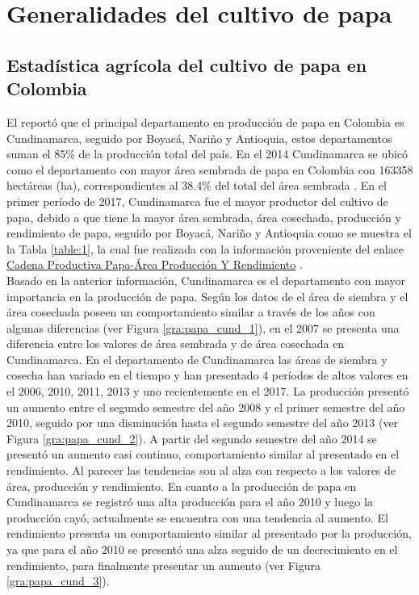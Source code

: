 \section{Generalidades del cultivo de papa}

\subsection{Estadística agrícola del cultivo de papa en Colombia}

El \citet{DANE2002} reportó que el principal departamento en producción de papa en Colombia es Cundinamarca, seguido por Boyacá, Nariño y Antioquia, estos departamentos suman el 85\% de la producción total del país. En el 2014 Cundinamarca se ubicó como el departamento con mayor área sembrada de papa en Colombia con 163358 hectáreas (ha), correspondientes al 38.4\% del total del área sembrada \citep{MADR2014}. En el primer período de 2017, Cundinamarca fue el mayor productor del cultivo de papa, debido a que tiene la mayor área sembrada, área cosechada, producción y rendimiento de papa, seguido por Boyacá, Nariño y Antioquia como se muestra el la Tabla \ref{table:1}, la cual fue realizada con la información proveniente del enlace \textcolor{blue}{ \href{https://www.datos.gov.co/Agricultura-y-Desarrollo-Rural/Cadena-Productiva-Papa-Area-Producci-n-Y-Rendimien/pnsj-t3kh}{Cadena Productiva Papa-Área Producción Y Rendimiento}} \citep{madr2017}.\\

Basado en la anterior información, Cundinamarca es el departamento con mayor importancia en la producción de papa. Según los datos de \citet{madr2017} el área de siembra y  el área cosechada poseen un comportamiento similar a través de los años con algunas diferencias (ver Figura \ref{gra:papa_cund_1}), en el 2007 se presenta una diferencia entre los valores de área sembrada y de área cosechada en Cundinamarca. En el departamento de Cundinamarca las áreas de siembra y cosecha han variado en el tiempo y han presentado 4 períodos de altos valores en el 2006,  2010, 2011, 2013 y uno recientemente en el 2017. La producción  presentó un aumento entre el segundo semestre del año 2008 y el primer semestre del año  2010, seguido por una disminución hasta el segundo semestre del año 2013 (ver Figura \ref{gra:papa_cund_2}). A partir del segundo semestre del año 2014 se presentó un aumento casi continuo, comportamiento similar al presentado en el rendimiento. Al parecer las tendencias son al alza con respecto a los valores de área, producción y rendimiento. En cuanto a la producción de papa en Cundinamarca se registró una alta producción para el año 2010 y luego la producción cayó, actualmente se encuentra con una tendencia al aumento. El rendimiento presenta un comportamiento similar al presentado por la producción, ya que para el año 2010 se presentó una alza seguido de un decrecimiento en el rendimiento, para finalmente presentar un aumento (ver Figura \ref{gra:papa_cund_3}). %


